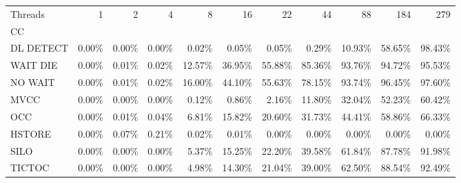 \begin{tabular}{lrrrrrrrrrr}
\toprule
Threads &   1   &   2   &   4   &    8   &    16  &    22  &    44  &    88  &    184 &    279 \\
CC        &       &       &       &        &        &        &        &        &        &        \\
\midrule
DL DETECT & 0.00\% & 0.00\% & 0.00\% &  0.02\% &  0.05\% &  0.05\% &  0.29\% & 10.93\% & 58.65\% & 98.43\% \\
WAIT DIE  & 0.00\% & 0.01\% & 0.02\% & 12.57\% & 36.95\% & 55.88\% & 85.36\% & 93.76\% & 94.72\% & 95.53\% \\
NO WAIT   & 0.00\% & 0.01\% & 0.02\% & 16.00\% & 44.10\% & 55.63\% & 78.15\% & 93.74\% & 96.45\% & 97.60\% \\
MVCC      & 0.00\% & 0.00\% & 0.00\% &  0.12\% &  0.86\% &  2.16\% & 11.80\% & 32.04\% & 52.23\% & 60.42\% \\
OCC       & 0.00\% & 0.01\% & 0.04\% &  6.81\% & 15.82\% & 20.60\% & 31.73\% & 44.41\% & 58.86\% & 66.33\% \\
HSTORE    & 0.00\% & 0.07\% & 0.21\% &  0.02\% &  0.01\% &  0.00\% &  0.00\% &  0.00\% &  0.00\% &  0.00\% \\
SILO      & 0.00\% & 0.00\% & 0.00\% &  5.37\% & 15.25\% & 22.20\% & 39.58\% & 61.84\% & 87.78\% & 91.98\% \\
TICTOC    & 0.00\% & 0.00\% & 0.00\% &  4.98\% & 14.30\% & 21.04\% & 39.00\% & 62.50\% & 88.54\% & 92.49\% \\
\bottomrule
\end{tabular}
